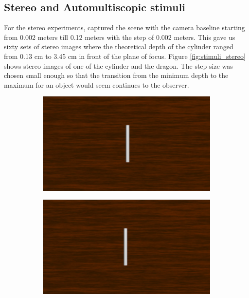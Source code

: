 \subsection{Stereo and Automultiscopic stimuli}
For the stereo experiments, captured the scene with the camera baseline starting from 0.002 meters till 0.12 meters with the step of 0.002 meters. This gave us sixty sets of stereo images where the theoretical depth of the cylinder ranged from 0.13 cm to 3.45 cm in front of the plane of focus. Figure \ref{fig:stimuli_stereo} shows stereo images of one of the cylinder and the dragon. The step size was chosen small enough so that the transition from the minimum depth to the maximum for an object would seem continues to the observer.
\begin{figure}[htbp]
    \begin{subfigure}[b]{0.5\textwidth}
        \includegraphics[width=\textwidth]{./Template_Figures/57L.png}
        \caption{}\label{fig:left_stereo_cyl}
    \end{subfigure}
    \begin{subfigure}[b]{0.5\textwidth}
        \includegraphics[width=\textwidth]{./Template_Figures/57R}
        \caption{}\label{fig:right_stereo_cyl}
    \end{subfigure}


\end{figure}
